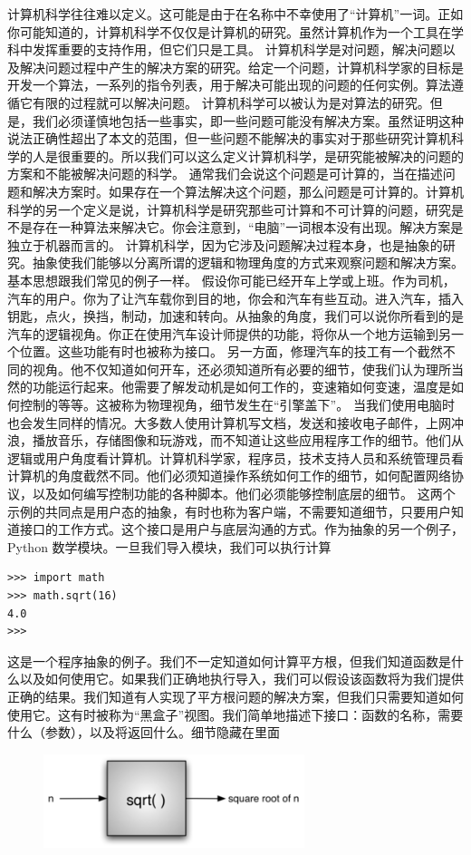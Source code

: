 \documentclass[10pt,a4paper]{article}
\begin{document}
计算机科学往往难以定义。这可能是由于在名称中不幸使用了“计算机”一词。正如你可能知道的，计算机科学不仅仅是计算机的研究。虽然计算机作为一个工具在学科中发挥重要的支持作用，但它们只是工具。
计算机科学是对问题，解决问题以及解决问题过程中产生的解决方案的研究。给定一个问题，计算机科学家的目标是开发一个算法，一系列的指令列表，用于解决可能出现的问题的任何实例。算法遵循它有限的过程就可以解决问题。
计算机科学可以被认为是对算法的研究。但是，我们必须谨慎地包括一些事实，即一些问题可能没有解决方案。虽然证明这种说法正确性超出了本文的范围，但一些问题不能解决的事实对于那些研究计算机科学的人是很重要的。所以我们可以这么定义计算机科学，是研究能被解决的问题的方案和不能被解决问题的科学。
通常我们会说这个问题是可计算的，当在描述问题和解决方案时。如果存在一个算法解决这个问题，那么问题是可计算的。计算机科学的另一个定义是说，计算机科学是研究那些可计算和不可计算的问题，研究是不是存在一种算法来解决它。你会注意到，“电脑”一词根本没有出现。解决方案是独立于机器而言的。
计算机科学，因为它涉及问题解决过程本身，也是抽象的研究。抽象使我们能够以分离所谓的逻辑和物理角度的方式来观察问题和解决方案。基本思想跟我们常见的例子一样。
假设你可能已经开车上学或上班。作为司机，汽车的用户。你为了让汽车载你到目的地，你会和汽车有些互动。进入汽车，插入钥匙，点火，换挡，制动，加速和转向。从抽象的角度，我们可以说你所看到的是汽车的逻辑视角。你正在使用汽车设计师提供的功能，将你从一个地方运输到另一个位置。这些功能有时也被称为接口。
另一方面，修理汽车的技工有一个截然不同的视角。他不仅知道如何开车，还必须知道所有必要的细节，使我们认为理所当然的功能运行起来。他需要了解发动机是如何工作的，变速箱如何变速，温度是如何控制的等等。这被称为物理视角，细节发生在“引擎盖下”。
当我们使用电脑时也会发生同样的情况。大多数人使用计算机写文档，发送和接收电子邮件，上网冲浪，播放音乐，存储图像和玩游戏，而不知道让这些应用程序工作的细节。他们从逻辑或用户角度看计算机。计算机科学家，程序员，技术支持人员和系统管理员看计算机的角度截然不同。他们必须知道操作系统如何工作的细节，如何配置网络协议，以及如何编写控制功能的各种脚本。他们必须能够控制底层的细节。
这两个示例的共同点是用户态的抽象，有时也称为客户端，不需要知道细节，只要用户知道接口的工作方式。这个接口是用户与底层沟通的方式。作为抽象的另一个例子，Python 数学模块。一旦我们导入模块，我们可以执行计算
\begin{lstlisting}
>>> import math
>>> math.sqrt(16)
4.0
>>>
\end{lstlisting}

这是一个程序抽象的例子。我们不一定知道如何计算平方根，但我们知道函数是什么以及如何使用它。如果我们正确地执行导入，我们可以假设该函数将为我们提供正确的结果。我们知道有人实现了平方根问题的解决方案，但我们只需要知道如何使用它。这有时被称为“黑盒子”视图。我们简单地描述下接口：函数的名称，需要什么（参数），以及将返回什么。细节隐藏在里面
\begin{figure}[htbp]
\centering
\includegraphics[width=3in]{images/blackbox.png}
\end{figure}
\end{document}
